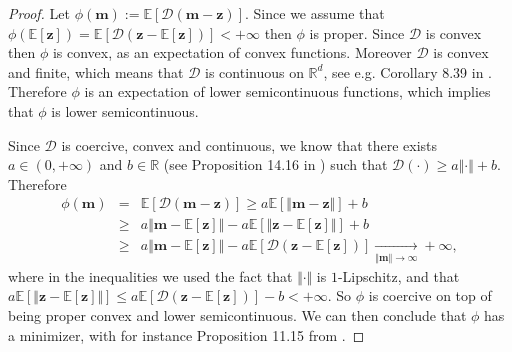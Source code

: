 \documentclass[10pt]{article} %
\newcommand{\bz}{\bm{z}}
\newcommand{\m}{\bm{m}}
\let\temp\phi
\let\phi\varphi
\let\varphi\temp
\begin{document}
\begin{proof}
    Let $\varphi(\m):= \mathbb{E}\left[ \mathcal{D}(\m - \bz) \right]$.
    Since we assume that $\varphi(\mathbb{E}\left[ \bz \right]) = \mathbb{E}\left[ \mathcal{D}(\bz - \mathbb{E}\left[ \bz \right]) \right] < + \infty$ then $\varphi$ is proper.
    Since $\mathcal{D}$ is convex then $\varphi$ is convex, as an expectation of convex functions.
    Moreover $\mathcal{D}$ is convex and finite, which means that $\mathcal{D}$ is continuous on $\mathbb{R}^d$, see e.g. Corollary 8.39 in \citet{BauCom}.
    Therefore $\varphi$ is an expectation of  lower semicontinuous functions, which implies that $\varphi$ is lower semicontinuous.
    
    Since $\mathcal{D}$ is coercive, convex and continuous, we know that there exists $a \in (0,+\infty)$ and $b \in \mathbb{R}$ (see Proposition 14.16 in \citet{BauCom}) such that 
    $\mathcal{D}(\cdot) \geq a \Vert \cdot \Vert + b$.
    Therefore
    \begin{eqnarray*}
        \varphi(\m) & = & \mathbb{E}\left[ \mathcal{D}(\m - \bz) \right] 
        \geq
        a \mathbb{E}\left[ \Vert \m - \bz \Vert  \right] + b \\
        & \geq &
        a \Vert \m - \mathbb{E}\left[ \bz \right] \Vert - a\mathbb{E}\left[ \Vert \bz - \mathbb{E}\left[ \bz \right] \Vert \right] + b \\
        & \geq &
        a \Vert \m - \mathbb{E}\left[ \bz \right] \Vert - a\mathbb{E}\left[ \mathcal{D}( \bz - \mathbb{E}\left[ \bz \right] ) \right]
        \underset{\Vert \m \Vert \to \infty}{\longrightarrow} + \infty,
    \end{eqnarray*}
    where in the inequalities we used the fact that $\Vert \cdot \Vert$ is $1$-Lipschitz, and that $a \mathbb{E}\left[ \Vert \bz - \mathbb{E}\left[ \bz \right] \Vert \right] \leq a \mathbb{E}\left[ \mathcal{D}(\bz - \mathbb{E}\left[ \bz \right]) \right] -b < + \infty$.
    So $\varphi$ is coercive on top of being proper convex and lower semicontinuous. We can then conclude that $\varphi$ has a minimizer, with for instance Proposition 11.15 from \citet{BauCom}.
\end{proof}

\end{document}
